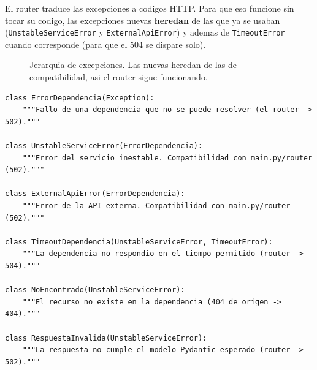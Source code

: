 \documentclass[11pt,a4paper]{article}
\newcommand{\arch}[1]{\texttt{#1}}
\begin{document}
El router traduce las excepciones a codigos HTTP. Para que eso funcione sin
tocar su codigo, las excepciones nuevas \textbf{heredan} de las que ya se
usaban (\arch{UnstableServiceError} y \arch{ExternalApiError}) y ademas de
\arch{TimeoutError} cuando corresponde (para que el 504 se dispare solo).

\begin{figure}[H]
\centering
{}
\caption{Jerarquia de excepciones. Las nuevas heredan de las de
compatibilidad, asi el router sigue funcionando.}
\label{fig:exc}
\end{figure}

\begin{lstlisting}[caption={app/clients/\_\_init\_\_.py (fragmento)}]
class ErrorDependencia(Exception):
    """Fallo de una dependencia que no se puede resolver (el router -> 502)."""

class UnstableServiceError(ErrorDependencia):
    """Error del servicio inestable. Compatibilidad con main.py/router (502)."""

class ExternalApiError(ErrorDependencia):
    """Error de la API externa. Compatibilidad con main.py/router (502)."""

class TimeoutDependencia(UnstableServiceError, TimeoutError):
    """La dependencia no respondio en el tiempo permitido (router -> 504)."""

class NoEncontrado(UnstableServiceError):
    """El recurso no existe en la dependencia (404 de origen -> 404)."""

class RespuestaInvalida(UnstableServiceError):
    """La respuesta no cumple el modelo Pydantic esperado (router -> 502)."""
\end{lstlisting}
\end{document}
